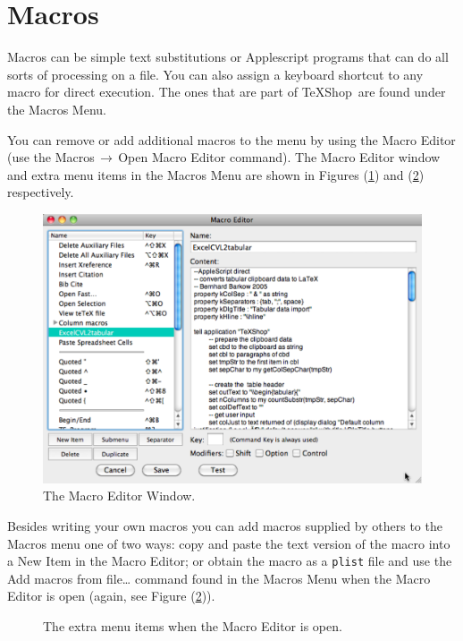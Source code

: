 \documentclass[letterpaper,11pt]{article}
\newcommand{\TS}{\textsf{\TeX Shop}}
\newcommand{\mnu}[1]{\textsf{#1}}
\newcommand{\To}{\,\(\to\)\,}
\begin{document}
\section{Macros}

Macros can be simple text substitutions or Applescript programs that can do all sorts of processing on a file. You can also assign a keyboard shortcut to any macro for direct execution. The ones that are part of \TS\ are found under the \mnu{Macros} Menu.

You can remove or add additional macros to the menu by using the \mnu{Macro Editor} (use the \mnu{Macros}\To\mnu{Open Macro Editor} command). The \mnu{Macro Editor} window and extra menu items in the \mnu{Macros} Menu are shown in Figures (\ref{fig:MacroEditorWindow}) and (\ref{fig:MacrosMenu}) respectively.
\begin{figure}
\centering
\includegraphics[width=4.75in]{figs/MacroEditorWindow}
\caption{The Macro Editor Window.}
\label{fig:MacroEditorWindow}
\end{figure}

Besides writing your own macros you can add macros supplied by others to the \mnu{Macros} menu one of two ways: copy and paste the text version of the macro into a \mnu{New Item} in the \mnu{Macro Editor}; or obtain the macro as a \texttt{plist} file and use the \mnu{Add macros from file…} command found in the \mnu{Macros} Menu when the \mnu{Macro Editor} is open (again, see Figure (\ref{fig:MacrosMenu})).
\begin{figure}
\centering
{}
\caption{The extra menu items when the Macro Editor is open.}
\label{fig:MacrosMenu}
\end{figure}
\end{document}
